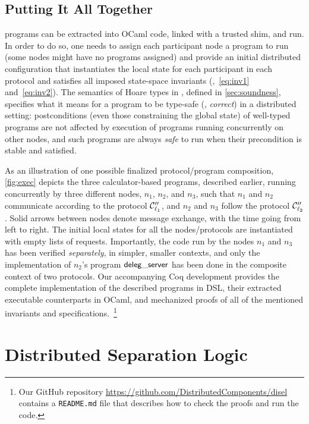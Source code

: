 \subsection{Putting It All Together}
\label{sec:all-together}

\disel programs can be extracted into OCaml code, linked with a
trusted shim, and run. In order to do so, one needs to assign each
participant node a program to run (some nodes might have no programs
assigned) and provide an initial distributed configuration that
instantiates the local state for each participant in each protocol and
satisfies all imposed state-space invariants (\eg,~\eqref{eq:inv1}
and~\eqref{eq:inv2}). The semantics of Hoare types in \disel, defined
in \cref{sec:soundness}, specifies what it means for a
program to be type-safe (\ie, \emph{correct}) in a distributed
setting: postconditions (even those constraining the global state) of
well-typed programs are not affected by execution of programs running
concurrently on other nodes, and such programs are always \emph{safe}
to run when their precondition is stable and satisfied.

As an illustration of one possible finalized protocol/program
composition, \cref{fig:exec} depicts the three calculator-based
programs, described earlier, running concurrently by three different
nodes, $n_1$, $n_2$, and $n_3$, such that $n_1$ and $n_2$ communicate
according to the protocol $\mathcal{C}''_{\ell_1}$, and $n_2$ and $n_3$
follow the protocol $\mathcal{C}''_{\ell_2}$.
%
Solid arrows between nodes denote message exchange, with the time
going from left to right.  The initial local states for all the
nodes/protocols are instantiated with empty lists of requests.
%
Importantly, the code run by the nodes $n_1$ and $n_3$ has been
verified \emph{separately}, in simpler, smaller contexts, and only the
implementation of $n_2$'s program $\mathsf{deleg\_server}$ has been done in the
composite context of two protocols.
%
Our accompanying Coq development provides the complete implementation
of the described programs in \disel DSL, their extracted executable
counterparts in OCaml, and mechanized proofs of all of the mentioned
invariants and specifications.~\footnote{Our GitHub repository
\url{https://github.com/DistributedComponents/disel} contains a \texttt{README.md}
file that describes how to check the proofs and run the code.}

\section{Distributed Separation Logic}
\label{sec:logic}

